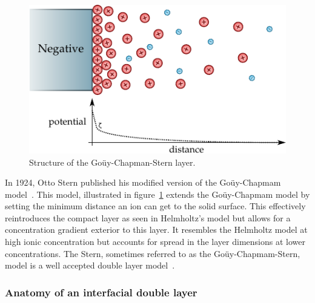     \begin{figure}
      \begin{center}
        \includegraphics{content/introduction/graphics/model_stern}
      \end{center}
      \caption{Structure of the Goüy-Chapman-Stern layer.}
      \label{fig:doubleLayerModel_stern}
    \end{figure}

    In 1924, Otto Stern published his modified version of the Goüy-Chapmam model~\cite{Stern1924}.
    This model, illustrated in figure~\ref{fig:doubleLayerModel_stern} extends the Goüy-Chapmam model by setting the minimum distance an ion can get to the solid surface.
    This effectively reintroduces the compact layer as seen in Helmholtz's model but allows for a concentration gradient exterior to this layer.
    It resembles the Helmholtz model at high ionic concentration but accounts for spread in the layer dimensions at lower concentrations.
    The Stern, sometimes referred to as the Goüy-Chapmam-Stern, model is a well accepted double layer model~\cite{Olthuis2005}.

  \subsubsection*{Anatomy of an interfacial double layer}


